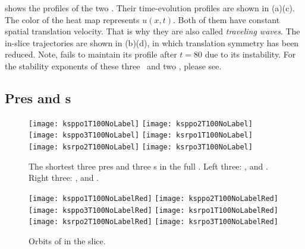  shows the profiles of the two \reqva. Their time-evolution profiles
are shown in (a)(c). The color of the heat map represents $u(x, t)$.
Both of them have constant spatial translation velocity. That is why they are also called
\emph{traveling waves}. The in-slice trajectories are shown in (b)(d),
in which translation symmetry has been reduced. Note,  fails to maintain its
profile after $t=80$ due to its instability. For the stability exponents of these three
\eqva\ and two
\reqva, please see.

\subsection{Pre\po s and \rpo s}

\begin{figure}[ht]
  \centering
  \texttt{[image: ksppo1T100NoLabel]}
  \texttt{[image: ksppo2T100NoLabel]}
  \texttt{[image: ksppo3T100NoLabel]}
  \texttt{[image: ksrpo1T100NoLabel]}
  \texttt{[image: ksrpo2T100NoLabel]}
  \texttt{[image: ksrpo3T100NoLabel]}
  \caption[Pre\po s and \rpo s in the full \statesp.]
  {
    The shortest three pre\po s and three \rpo s in the full \statesp.
    Left three: ,  and .
    Right three: ,  and .
  }
  \label{fig:kspoT100}
\end{figure}

\begin{figure}[ht]
  \centering
  \texttt{[image: ksppo1T100NoLabelRed]}
  \texttt{[image: ksppo2T100NoLabelRed]}
  \texttt{[image: ksppo3T100NoLabelRed]}
  \texttt{[image: ksrpo1T100NoLabelRed]}
  \texttt{[image: ksrpo2T100NoLabelRed]}
  \texttt{[image: ksrpo3T100NoLabelRed]}
  \caption[Pre\po s and \rpo s in the slice.]
  {Orbits of  in the slice.}
  \label{fig:kspoT100Red}
\end{figure}

